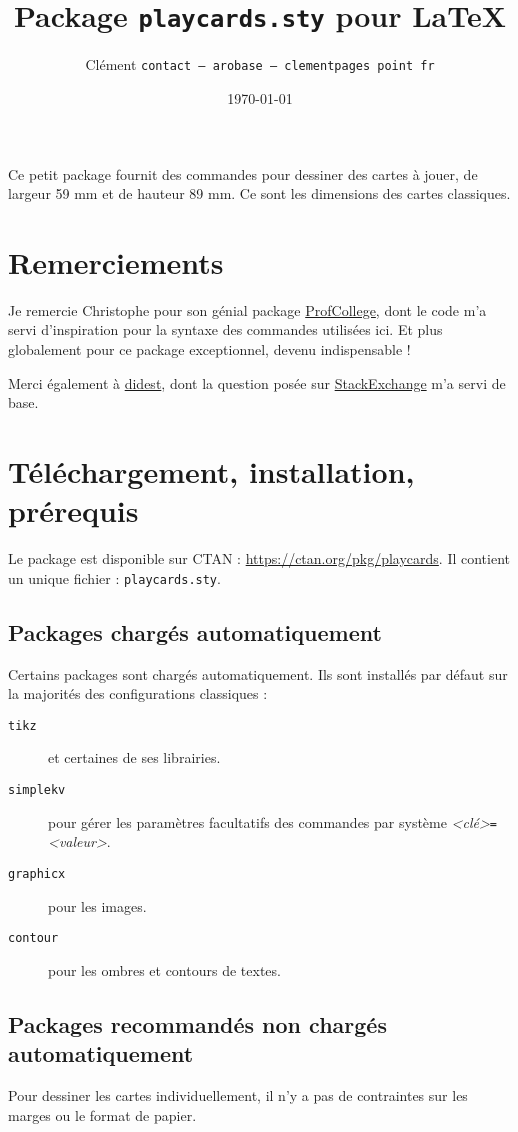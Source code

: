 \documentclass[a4paper, 12pt]{article}
\title{Package \texttt{playcards.sty} pour \LaTeX}
\date{\today}
\author{Clément \bsc{Pagès} \texttt{contact -- arobase -- clementpages point fr}}
\newcommand{\package}[1]{\texttt{#1}}
\newcommand{\kv}[2]{\textit{<#1>}\texttt=\textit{<#2>}}
\begin{document}
\maketitle

Ce petit package fournit des commandes pour dessiner des cartes à jouer, de largeur 59 mm et de hauteur 89 mm. Ce sont les dimensions des cartes classiques.

\tableofcontents

\section*{Remerciements}
Je remercie Christophe  pour son génial package \href{https://ctan.org/pkg/profcollege}{ProfCollege}, dont le code m'a servi d'inspiration pour la syntaxe des commandes utilisées ici. Et plus globalement pour ce package exceptionnel, devenu indispensable !

Merci également à \href{https://tex.stackexchange.com/users/1948/didest}{didest}, dont la question posée sur \href{https://tex.stackexchange.com/questions/47924/creating-playing-cards-using-tikz}{StackExchange} m'a servi de base.

\section{Téléchargement, installation, prérequis}
Le package est disponible sur CTAN : \url{https://ctan.org/pkg/playcards}. Il contient un unique fichier : \texttt{playcards.sty}.

	\subsection{Packages chargés automatiquement}
Certains packages sont chargés automatiquement. Ils sont installés par défaut sur la majorités des configurations classiques :
\begin{description}
	\item[\package{tikz}] et certaines de ses librairies.
	\item[\package{simplekv}] pour gérer les paramètres facultatifs des commandes par système \kv{clé}{valeur}.
	\item[\package{graphicx}] pour les images. 
	\item[\package{contour}] pour les ombres et contours de textes.
\end{description}

	\subsection{Packages recommandés non chargés automatiquement}
Pour dessiner les cartes individuellement, il n'y a pas de contraintes sur les marges ou le format de papier.
\end{document}
